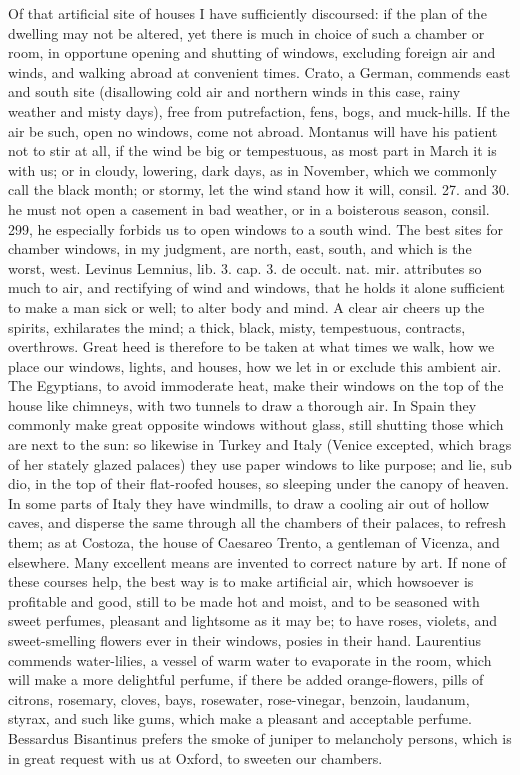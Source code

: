 {Of that artificial site of houses I have sufficiently discoursed: if
the plan of the dwelling may not be altered, yet there is much in
choice of such a chamber or room, in opportune opening and shutting of
windows, excluding foreign air and winds, and walking abroad at
convenient times. Crato, a German, commends east and south site
(disallowing cold air and northern winds in this case, rainy weather
and misty days), free from putrefaction, fens, bogs, and muck-hills. If
the air be such, open no windows, come not abroad. Montanus will have
his patient not to stir at all, if the wind be big or
tempestuous, as most part in March it is with us; or in cloudy,
lowering, dark days, as in November, which we commonly call the black
month; or stormy, let the wind stand how it will, consil. 27. and 30.
he must not open a casement in bad weather, or in a boisterous
season, consil. 299, he especially forbids us to open windows to a
south wind. The best sites for chamber windows, in my judgment, are
north, east, south, and which is the worst, west. Levinus Lemnius, lib.
3. cap. 3. de occult. nat. mir. attributes so much to air, and
rectifying of wind and windows, that he holds it alone sufficient to
make a man sick or well; to alter body and mind. A clear air
cheers up the spirits, exhilarates the mind; a thick, black, misty,
tempestuous, contracts, overthrows. Great heed is therefore to be taken
at what times we walk, how we place our windows, lights, and houses,
how we let in or exclude this ambient air. The Egyptians, to avoid
immoderate heat, make their windows on the top of the house like
chimneys, with two tunnels to draw a thorough air. In Spain they
commonly make great opposite windows without glass, still shutting
those which are next to the sun: so likewise in Turkey and Italy
(Venice excepted, which brags of her stately glazed palaces) they use
paper windows to like purpose; and lie, sub dio, in the top of their
flat-roofed houses, so sleeping under the canopy of heaven. In some
parts of Italy they have windmills, to draw a cooling air out of
hollow caves, and disperse the same through all the chambers of their
palaces, to refresh them; as at Costoza, the house of Caesareo Trento,
a gentleman of Vicenza, and elsewhere. Many excellent means are
invented to correct nature by art. If none of these courses help, the
best way is to make artificial air, which howsoever is profitable and
good, still to be made hot and moist, and to be seasoned with sweet
perfumes, pleasant and lightsome as it may be; to have roses,
violets, and sweet-smelling flowers ever in their windows, posies in
their hand. Laurentius commends water-lilies, a vessel of warm water to
evaporate in the room, which will make a more delightful perfume, if
there be added orange-flowers, pills of citrons, rosemary, cloves,
bays, rosewater, rose-vinegar, benzoin, laudanum, styrax, and such like
gums, which make a pleasant and acceptable perfume. Bessardus
Bisantinus prefers the smoke of juniper to melancholy persons, which is
in great request with us at Oxford, to sweeten our chambers.

}
